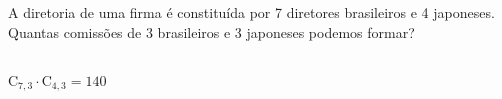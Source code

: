 \begin{ex}
A diretoria de uma firma é constituída por 7 diretores brasileiros e 4 japoneses. Quantas comissões de 3 brasileiros e 3 japoneses podemos formar?
  \begin{sol}
   \phantom{A} \\
   $\mathrm{C}_{7,3}\cdot\mathrm{C}_{4,3}=140$
  \end{sol}
\end{ex}